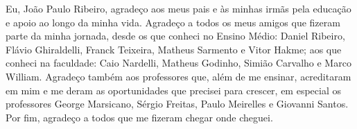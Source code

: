 \begin{agradecimentos}
Eu, João Paulo Ribeiro, agradeço aos meus pais e às minhas irmãs pela educação e apoio ao longo da minha vida. Agradeço a todos os meus amigos que fizeram parte da minha jornada, desde os que conheci no Ensino Médio: Daniel Ribeiro, Flávio Ghiraldelli, Franck Teixeira, Matheus Sarmento e Vitor Hakme; aos que conheci na faculdade: Caio Nardelli, Matheus Godinho, Simião Carvalho e Marco William. Agradeço também aos professores que, além de me ensinar, acreditaram em mim e me deram as oportunidades que precisei para crescer, em especial os professores George Marsicano, Sérgio Freitas, Paulo Meirelles e Giovanni Santos. Por fim, agradeço a todos que me fizeram chegar onde cheguei.
\end{agradecimentos}
